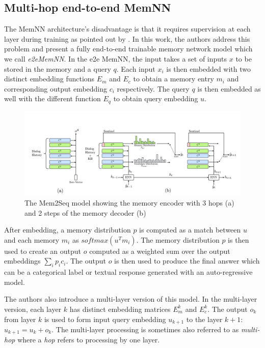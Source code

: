 \subsection{Multi-hop end-to-end MemNN}
The MemNN architecture's disadvantage is that it requires supervision at each layer during training as pointed out by \citet{sukhbaatar2015end}.
In this work, the authors address this problem and present a fully end-to-end trainable memory network model which we call \emph{e2eMemNN}.
In the e2e MemNN, the input takes a set of inputs $x$ to be stored in the memory and a query $q$.
Each input $x_i$ is then embedded with two distinct embedding functions $E_m$ and $E_c$ to obtain a memory entry $m_i$ and corresponding output embedding $c_i$ respectively.
The query $q$ is then embedded as well with the different function $E_q$ to obtain query embedding $u$.

\begin{figure}[t]
    \centering
    \includegraphics[width=\textwidth]{images/mem2seq.png}
    \caption{The Mem2Seq model \cite{madotto-etal-2018-mem2seq} showing the memory encoder with 3 hops (a) and 2 steps of the memory decoder (b) }
    \label{fig:mem2seq}
\end{figure}

After embedding, a memory distribution $p$ is computed as a match between $u$ and each memory $m_i$ as $softmax (u^Tm_i)$.
The memory distribution $p$ is then used to create an output $o$ computed as a weighted sum over the output embeddings $\sum_i p_ic_i$.
The output $o$ is then used to produce the final answer which can be a categorical label or textual response generated with an auto-regressive model.

The authors also introduce a multi-layer version of this model.
In the multi-layer version, each layer $k$ has distinct embedding matrices $E^k_m$ and $E^k_c$. The output $o_k$ from layer $k$ is used to form input query embedding $u_{k+1}$ to the layer $k+1$: $u_{k+1} = u_k + o_k$.
The multi-layer processing is sometimes also referred to as \emph{multi-hop} where a \emph{hop} refers to processing by one layer.

